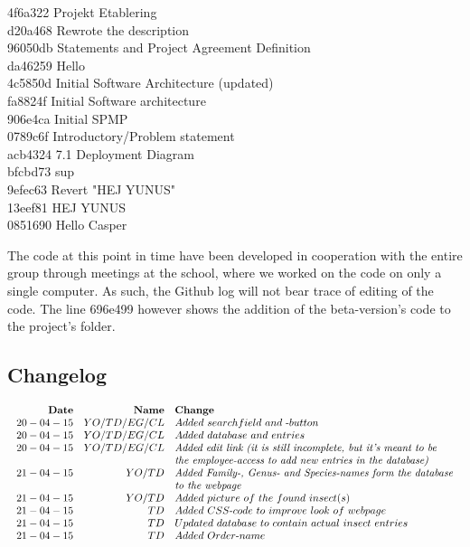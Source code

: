 \documentclass[12pt,a4paper]{article}
\begin{document}
4f6a322 Projekt Etablering\\
d20a468 Rewrote the description\\
96050db Statements and Project Agreement Definition\\
da46259 Hello\\
4c5850d Initial Software Architecture (updated)\\
fa8824f Initial Software architecture\\
906e4ca Initial SPMP\\
0789c6f Introductory/Problem statement\\
acb4324 7.1 Deployment Diagram\\
bfcbd73 sup\\
9efec63 Revert "HEJ YUNUS"\\
13eef81 HEJ YUNUS\\
0851690 Hello Casper\\
\noindent\makebox[\linewidth]{\rule{16.5cm}{0.4pt}}

The code at this point in time have been developed in cooperation with the entire group through meetings at the school, where we worked on the code on only a single computer. As such, the Github log will not bear trace of editing of the code. The line 696e499 however shows the addition of the beta-version's code to the project's folder.

\subsection{Changelog}

	$$
	\begin{array}{rrl}
	\bf{Date} & \bf{Name} & \bf{Change} \\ 
	20-04-15 & YO/TD/EG/CL & Added~searchfield~and~\text{-}button \\
	20-04-15 & YO/TD/EG/CL & Added~database~and~entries \\
	20-04-15 & YO/TD/EG/CL & \vtop{\hbox{\strut \emph{Added~edit~link~(it~is~still~incomplete,~but~it’s~meant~to~be}}\hbox{\strut \emph{the~employee\text{-}access~to~add~new~entries~in~the~database)}}} \\
	21-04-15 & YO/TD & \vtop{\hbox{\strut \emph{Added~Family\text{-},~Genus\text{-}~and~Species\text{-}names~form~the~database}}\hbox{\strut \emph{to~the~webpage}}} ~\\~
	21-04-15 & YO/TD & Added~picture~of~the~found~insect(s) \\
	21-04-15 & TD & Added~CSS\text{-}code~to~improve~look~of~webpage \\
	21-04-15 & TD & Updated~database~to~contain~actual~insect~entries\\
	21-04-15 & TD & Added~Order\text{-}name
	\end{array}
	$$
\end{document}
